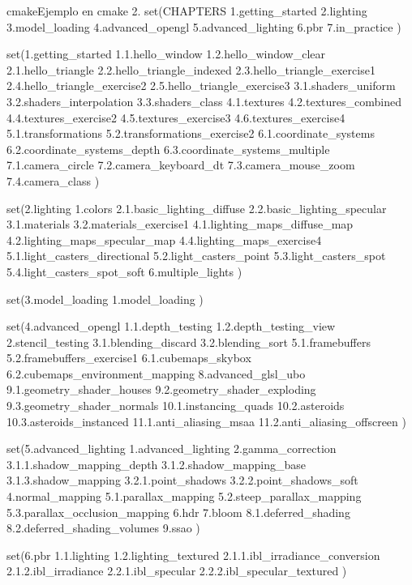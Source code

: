 \begin{sourcecode}{cmake}{Ejemplo en cmake 2.}
set(CHAPTERS
    1.getting_started
    2.lighting
    3.model_loading
    4.advanced_opengl
    5.advanced_lighting
    6.pbr
    7.in_practice
)

set(1.getting_started
    1.1.hello_window
    1.2.hello_window_clear
    2.1.hello_triangle
    2.2.hello_triangle_indexed
    2.3.hello_triangle_exercise1
    2.4.hello_triangle_exercise2
    2.5.hello_triangle_exercise3
    3.1.shaders_uniform
    3.2.shaders_interpolation
    3.3.shaders_class
    4.1.textures
    4.2.textures_combined
    4.4.textures_exercise2
    4.5.textures_exercise3
    4.6.textures_exercise4
    5.1.transformations
    5.2.transformations_exercise2
    6.1.coordinate_systems
    6.2.coordinate_systems_depth
    6.3.coordinate_systems_multiple
    7.1.camera_circle
    7.2.camera_keyboard_dt
    7.3.camera_mouse_zoom
    7.4.camera_class
)

set(2.lighting
    1.colors
    2.1.basic_lighting_diffuse
    2.2.basic_lighting_specular
    3.1.materials
    3.2.materials_exercise1
    4.1.lighting_maps_diffuse_map
    4.2.lighting_maps_specular_map
    4.4.lighting_maps_exercise4
    5.1.light_casters_directional
    5.2.light_casters_point
    5.3.light_casters_spot
    5.4.light_casters_spot_soft
    6.multiple_lights
)

set(3.model_loading
    1.model_loading
)

set(4.advanced_opengl
    1.1.depth_testing
    1.2.depth_testing_view
    2.stencil_testing
    3.1.blending_discard
    3.2.blending_sort
    5.1.framebuffers
    5.2.framebuffers_exercise1
    6.1.cubemaps_skybox
    6.2.cubemaps_environment_mapping
    8.advanced_glsl_ubo
    9.1.geometry_shader_houses
    9.2.geometry_shader_exploding
    9.3.geometry_shader_normals
    10.1.instancing_quads
    10.2.asteroids
    10.3.asteroids_instanced
    11.1.anti_aliasing_msaa
    11.2.anti_aliasing_offscreen
)

set(5.advanced_lighting
    1.advanced_lighting
    2.gamma_correction
    3.1.1.shadow_mapping_depth
    3.1.2.shadow_mapping_base
    3.1.3.shadow_mapping
    3.2.1.point_shadows
    3.2.2.point_shadows_soft
    4.normal_mapping
    5.1.parallax_mapping
    5.2.steep_parallax_mapping
    5.3.parallax_occlusion_mapping
    6.hdr
    7.bloom
    8.1.deferred_shading
    8.2.deferred_shading_volumes
    9.ssao
)

set(6.pbr
    1.1.lighting
    1.2.lighting_textured
    2.1.1.ibl_irradiance_conversion
    2.1.2.ibl_irradiance
    2.2.1.ibl_specular
    2.2.2.ibl_specular_textured
)


\end{sourcecode}
